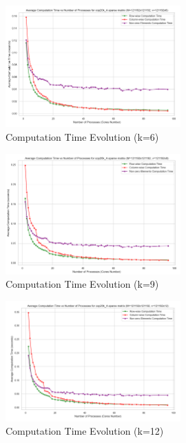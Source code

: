 \documentclass[12pt,oneside]{book} %
\begin{document}
\begin{figure}[H]
    \centering
    \includegraphics[width=0.6\textwidth]{../results/fat_vector_dim/cop20k_A_k6_computation_time.png}
    \caption{Computation Time Evolution (k=6)}\label{fig:cop20k-a-k6-computation-time}
\end{figure}

\begin{figure}[H]
    \centering
    \includegraphics[width=0.6\textwidth]{../results/fat_vector_dim/cop20k_A_k9_computation_time.png}
    \caption{Computation Time Evolution (k=9)}\label{fig:cop20k-a-k9-computation-time}
\end{figure}

\begin{figure}[H]
    \centering
    \includegraphics[width=0.6\textwidth]{../results/fat_vector_dim/cop20k_A_k12_computation_time.png}
    \caption{Computation Time Evolution (k=12)}\label{fig:cop20k-a-k12-computation-time}
\end{figure}
\end{document}
